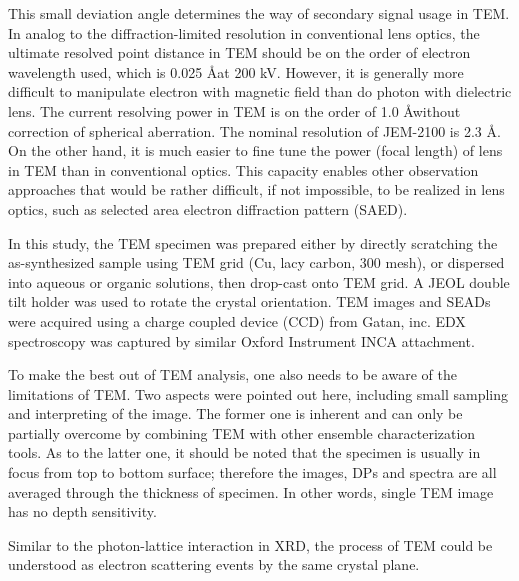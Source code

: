 This small deviation angle determines the way of secondary signal usage in TEM. In analog to the diffraction-limited resolution in conventional lens optics, the ultimate resolved point distance in TEM should be on the order of electron wavelength used, which is 0.025 \AA at 200 kV. However, it is generally more difficult to manipulate electron with magnetic field than do photon with dielectric lens. The current resolving power in TEM is on the order of 1.0 \AA without correction of spherical aberration. The nominal resolution of JEM-2100 is 2.3 \AA. On the other hand, it is much easier to fine tune the power (focal length) of lens in TEM than in conventional optics. This capacity enables other observation approaches that would be rather difficult, if not impossible, to be realized in lens optics, such as selected area electron diffraction pattern (SAED). 

In this study, the TEM specimen was prepared either by directly scratching the as-synthesized sample using TEM grid (Cu, lacy carbon, 300 mesh), or dispersed into aqueous or organic solutions, then drop-cast onto TEM grid. A JEOL double tilt holder was used to rotate the crystal orientation. TEM images and SEADs were acquired using a charge coupled device (CCD) from Gatan, inc. EDX spectroscopy was captured by similar Oxford Instrument INCA attachment. 

To make the best out of TEM analysis, one also needs to be aware of the limitations of TEM. Two aspects were pointed out here, including small sampling and interpreting of the image. The former one is inherent and can only be partially overcome by combining TEM with other ensemble characterization tools. As to the latter one, it should be noted that the specimen is usually in focus from top to bottom surface; therefore the images, DPs and spectra are all averaged through the thickness of specimen. In other words, single TEM image has no depth sensitivity.\cite{Williams2009}  

\iffalse
Similar to the photon-lattice interaction in XRD, the process of TEM could be understood as electron scattering events by the same crystal plane. 

